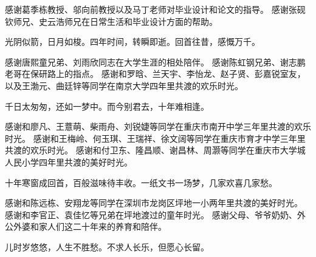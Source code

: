 \documentclass[
  ]{njuthesis}
\begin{document}

\printbibliography


\begin{acknowledgement}
    
    感谢葛季栋教授、邬向前教授以及马丁老师对毕业设计和论文的指导。
    感谢张砚钦师兄、史云浩师兄在日常生活和毕业设计方面的帮助。
    
    光阴似箭，日月如梭。四年时间，转瞬即逝。回首往昔，感慨万千。
    
    感谢唐熙童兄弟、刘雨欣同志在大学生涯的相处陪伴。
    感谢陈虹钢兄弟、谢志鹏老哥在保研路上的指点。
    感谢和罗晗、兰天宇、李怡龙、赵子贤、彭嘉锐室友，以及王渤元、曲廷锌等同学在南京大学四年里共渡的欢乐时光。
    
    千日太匆匆，还如一梦中。而今别君去，十年难相逢。
    
    感谢和廖凡、王薏萌、柴雨舟、刘锐婕等同学在重庆市南开中学三年里共渡的欢乐时光。
    感谢和王梅岭、何玉琪、王瑞祥、徐文阔等同学在重庆市育才中学三年里共渡的欢乐时光。
    感谢和付卫东、隆昌顺、谢昌林、周灏等同学在重庆市大学城人民小学四年里共渡的美好时光。
    
    十年寒窗成回首，百般滋味待丰收。一纸文书一场梦，几家欢喜几家愁。
    
    感谢和陈远栋、安翔龙等同学在深圳市龙岗区坪地一小两年里共渡的美好时光。
    感谢和李官正、袁佳忆等兄弟在坪地渡过的童年时光。
    感谢父母、爷爷奶奶、外公外婆和家人们这二十年来的养育和陪伴。
    
    儿时岁悠悠，人生不胜愁。不求人长乐，但愿心长留。

\end{acknowledgement}






\end{document}
